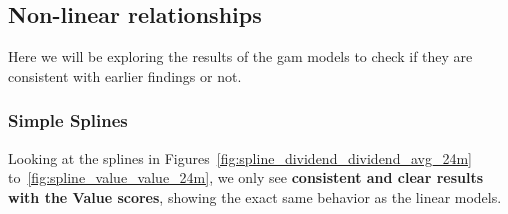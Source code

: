 \documentclass[11pt,english,a4paper,hidelinks]{book}
\begin{document}
\subsection{Non-linear relationships}

\noindent Here we will be exploring the results of the \acrshort{gam} models to check if they are consistent with earlier findings or not.

\subsubsection{Simple Splines}

\noindent Looking at the splines in Figures~\ref{fig:spline_dividend_dividend_avg_24m} to~\ref{fig:spline_value_value_24m}, we only see \textbf{consistent and clear results with the Value scores}, showing the exact same behavior as the linear models.
\end{document}
